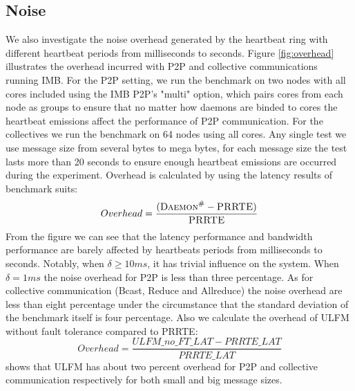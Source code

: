 \documentclass[sigconf]{acmart}
\newcommand{\prrte}[0]{\textsc{PRRTE}\xspace}
\newcommand{\ulfm}[0]{\textsc{ULFM}\xspace}
\newcommand{\ourwork}[0]{\textsc{Daemon}\ensuremath{^\#}\xspace}
\newcommand{\imb}[0]{\textsc{IMB}\xspace}
\begin{document}

\subsection{Noise}
We also investigate the noise overhead generated by the heartbeat ring with different heartbeat periods from milliseconds to seconds.
Figure \ref{fig:overhead} illustrates the overhead incurred with P2P and collective communications running \imb. 
For the P2P setting, we run the benchmark on two nodes with all cores included using the \imb P2P's "multi" option, which pairs cores from each node as groups to ensure that no matter how daemons are binded to cores the heartbeat emissions affect the performance of P2P communication. For the collectives we run the benchmark on 64 nodes using all cores. Any single test we use message size from several bytes to mega bytes, for each message size the test lasts more than 20 seconds to ensure enough heartbeat emissions are occurred during the experiment. Overhead is calculated by using the latency results of benchmark suits: 
\begin{equation}
Overhead = \frac{( {\ourwork - \prrte} )}{\prrte}
\end{equation}
 From the figure we can see that the latency performance and bandwidth performance are barely affected by heartbeats periods from milliseconds to seconds. Notably, when $ \delta \geq 10 ms $, it has trivial influence on the system. When  $ \delta = 1 ms $ the noise overhead for P2P is less than three percentage. As for collective communication (Bcast, Reduce and Allreduce) the noise overhead are less than eight percentage under the circumstance that the standard deviation of the benchmark itself is four percentage. Also we calculate the overhead of \ulfm without fault tolerance compared to \prrte:
 \begin{equation}
Overhead = \frac{ ULFM\_no\_FT\_LAT - PRRTE\_LAT }{PRRTE\_LAT}
\end{equation}
 shows that \ulfm has about two percent overhead for P2P and collective communication respectively for both small and big message sizes.
\end{document}
